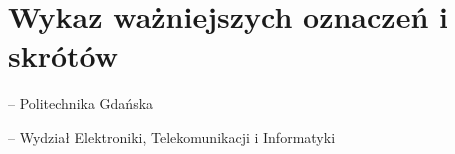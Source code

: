 
\clearpage
\section*{Wykaz ważniejszych oznaczeń i skrótów} %

\begin{description}[leftmargin=2.5cm,labelwidth=2cm]
\item[PG] -- Politechnika Gdańska
\item[WETI] -- Wydział Elektroniki, Telekomunikacji i Informatyki
\end{description}